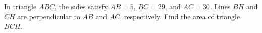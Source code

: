 In triangle $ABC$, the sides satisfy $AB=5$, $BC=29$, and $AC=30$. Lines $BH$ and $CH$ are perpendicular to $AB$ and $AC$, respectively. Find the area of triangle $BCH$.
